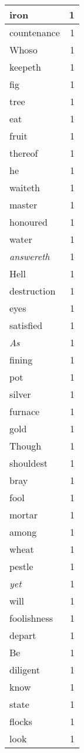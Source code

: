 \begin{center}
\begin{longtable}{l|r}
iron & 1\\ \hline 
countenance & 1\\ \hline 
Whoso & 1\\ \hline 
keepeth & 1\\ \hline 
fig & 1\\ \hline 
tree & 1\\ \hline 
eat & 1\\ \hline 
fruit & 1\\ \hline 
thereof & 1\\ \hline 
he & 1\\ \hline 
waiteth & 1\\ \hline 
master & 1\\ \hline 
honoured & 1\\ \hline 
water & 1\\ \hline 
\emph{answereth} & 1\\ \hline 
Hell & 1\\ \hline 
destruction & 1\\ \hline 
eyes & 1\\ \hline 
satisfied & 1\\ \hline 
\emph{As} & 1\\ \hline 
fining & 1\\ \hline 
pot & 1\\ \hline 
silver & 1\\ \hline 
furnace & 1\\ \hline 
gold & 1\\ \hline 
Though & 1\\ \hline 
shouldest & 1\\ \hline 
bray & 1\\ \hline 
fool & 1\\ \hline 
mortar & 1\\ \hline 
among & 1\\ \hline 
wheat & 1\\ \hline 
pestle & 1\\ \hline 
\emph{yet} & 1\\ \hline 
will & 1\\ \hline 
foolishness & 1\\ \hline 
depart & 1\\ \hline 
Be & 1\\ \hline 
diligent & 1\\ \hline 
know & 1\\ \hline 
state & 1\\ \hline 
flocks & 1\\ \hline 
look & 1\\ \hline 

\end{longtable}
\end{center}
